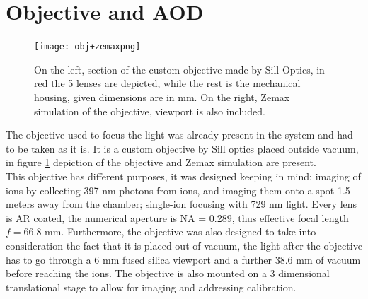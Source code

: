 \section{Objective and AOD}
\label{sec:obj}
%
\begin{figure}[H]
      \centering
          \centering
          \texttt{[image: obj+zemaxpng]}
           \caption{On the left, section of the custom objective made by Sill Optics, in red the 5 lenses are depicted, while the rest is the mechanical housing, given dimensions are in mm. On the right, Zemax simulation of the objective, viewport is also included.}
          \label{objsection}
\end{figure}
The objective used to focus the light was already present in the system and had to be taken as it is. It is a custom objective by Sill optics placed outside vacuum, in figure \ref{objsection} depiction of the objective and Zemax simulation are present.\\
This objective has different purposes, it was designed keeping in mind: imaging of ions by collecting 397 nm photons from ions, and imaging them onto a spot 1.5 meters away from the chamber; single-ion focusing with 729 nm light. Every lens is AR coated, the numerical aperture is NA = 0.289, thus effective focal length $f = 66.8$ mm. Furthermore, the objective was also designed to take into consideration the fact that it is placed out of vacuum, the light after the objective has to go through a 6 mm fused silica viewport and a further 38.6 mm of vacuum before reaching the ions. The objective is also mounted on a 3 dimensional translational stage to allow for imaging and addressing calibration.\\
